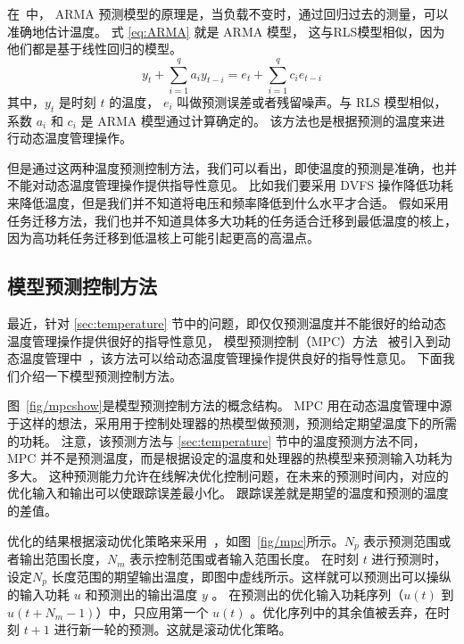 在~\cite{coskun2008proactive}中，  ARMA 预测模型的原理是，当负载不变时，通过回归过去的测量，可以准确地估计温度。
式  \eqref{eq:ARMA} 就是 ARMA 模型， 这与RLS模型相似，因为他们都是基于线性回归的模型。
\begin{equation}\label{eq:ARMA}
y_t + \sum_{i=1}^qa_iy_{t-i} = e_t +\sum_{i=1}^qc_ie_{t-i}
\end{equation}
其中，$y_t$ 是时刻 $t$ 的温度， $e_i$ 叫做预测误差或者残留噪声。与 RLS 模型相似，系数 $a_i$ 和 $c_i$ 是 ARMA 模型通过计算确定的。
该方法也是根据预测的温度来进行动态温度管理操作。

但是通过这两种温度预测控制方法，我们可以看出，即使温度的预测是准确，也并不能对动态温度管理操作提供指导性意见。
比如我们要采用 DVFS 操作降低功耗来降低温度，但是我们并不知道将电压和频率降低到什么水平才合适。 
假如采用任务迁移方法，我们也并不知道具体多大功耗的任务适合迁移到最低温度的核上，因为高功耗任务迁移到低温核上可能引起更高的高温点。

\subsection{模型预测控制方法}\label{sec:mpc}

最近，针对 \ref{sec:temperature} 节中的问题，即仅仅预测温度并不能很好的给动态温度管理操作提供很好的指导性意见，
模型预测控制（MPC）方法~\cite{Wang:MPC_BOOK'09} 被引入到动态温度管理中~\cite{Zanini:ECCTD'09}，该方法可以给动态温度管理操作提供良好的指导性意见。
下面我们介绍一下模型预测控制方法。

图~\ref{fig/mpcshow}是模型预测控制方法的概念结构。 MPC 用在动态温度管理中源于这样的想法，采用用于控制处理器的热模型做预测，预测给定期望温度下的所需的功耗。
注意，该预测方法与 \ref{sec:temperature} 节中的温度预测方法不同， MPC 并不是预测温度，而是根据设定的温度和处理器的热模型来预测输入功耗为多大。
这种预测能力允许在线解决优化控制问题，在未来的预测时间内，对应的优化输入和输出可以使跟踪误差最小化。 跟踪误差就是期望的温度和预测的温度的差值。

优化的结果根据滚动优化策略来采用~\cite{bemporad1999robust}，如图~\ref{fig/mpc}所示。$N_p$ 表示预测范围或者输出范围长度，$N_m$ 表示控制范围或者输入范围长度。
在时刻 $t$ 进行预测时，设定$N_p$ 长度范围的期望输出温度，即图中虚线所示。这样就可以预测出可以操纵的输入功耗 $u$ 和预测出的输出温度 $y$ 。
在预测出的优化输入功耗序列（$ u(t) $ 到 $ u(t+N_m-1) $）中，只应用第一个 $ u(t)$ 。优化序列中的其余值被丢弃，在时刻 $t+1$ 进行新一轮的预测。这就是滚动优化策略。 



